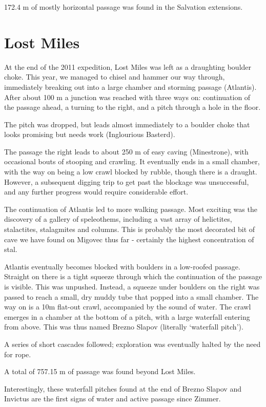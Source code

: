 172.4 m of mostly horizontal passage was found in the Salvation
extensions.

\section{Lost Miles}\label{lost-miles}

At the end of the 2011 expedition, Lost Miles was left as a draughting
boulder choke. This year, we managed to chisel and hammer our way
through, immediately breaking out into a large chamber and storming
passage (Atlantis). After about 100 m a junction was reached with three
ways on: continuation of the passage ahead, a turning to the right, and
a pitch through a hole in the floor.

The pitch was dropped, but leads almost immediately to a boulder choke
that looks promising but needs work (Inglourious Basterd).

The passage the right leads to about 250 m of easy caving (Minestrone),
with occasional bouts of stooping and crawling. It eventually ends in a
small chamber, with the way on being a low crawl blocked by rubble,
though there is a draught. However, a subsequent digging trip to get
past the blockage was unsuccessful, and any further progress would
require considerable effort.

The continuation of Atlantis led to more walking passage. Most exciting
was the discovery of a gallery of speleothems, including a vast array of
helictites, stalactites, stalagmites and columns. This is probably the
most decorated bit of cave we have found on Migovec thus far - certainly
the highest concentration of stal.

Atlantis eventually becomes blocked with boulders in a low-roofed
passage. Straight on there is a tight squeeze through which the
continuation of the passage is visible. This was unpushed. Instead, a
squeeze under boulders on the right was passed to reach a small, dry
muddy tube that popped into a small chamber. The way on is a 10m
flat-out crawl, accompanied by the sound of water. The crawl emerges in
a chamber at the bottom of a pitch, with a large waterfall entering from
above. This was thus named Brezno Slapov (literally `waterfall pitch').

A series of short cascades followed; exploration was eventually halted
by the need for rope.

A total of 757.15 m of passage was found beyond Lost Miles.

Interestingly, these waterfall pitches found at the end of Brezno Slapov
and Invictus are the first signs of water and active passage since
Zimmer.

